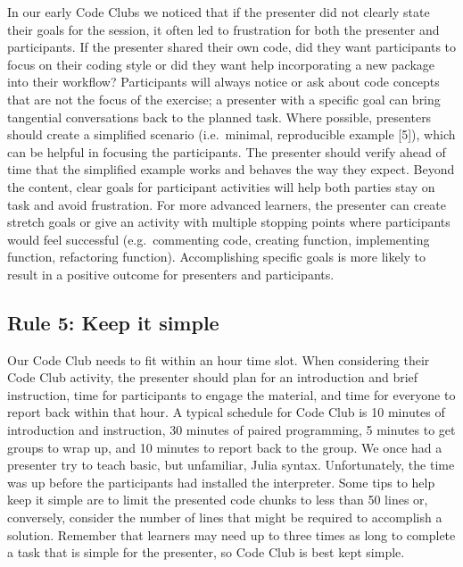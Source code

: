 \documentclass[
  11pt,
]{article}
\begin{document}
In our early Code Clubs we noticed that if the presenter did not clearly
state their goals for the session, it often led to frustration for both
the presenter and participants. If the presenter shared their own code,
did they want participants to focus on their coding style or did they
want help incorporating a new package into their workflow? Participants
will always notice or ask about code concepts that are not the focus of
the exercise; a presenter with a specific goal can bring tangential
conversations back to the planned task. Where possible, presenters
should create a simplified scenario (i.e.~minimal, reproducible example
{[}5{]}), which can be helpful in focusing the participants. The
presenter should verify ahead of time that the simplified example works
and behaves the way they expect. Beyond the content, clear goals for
participant activities will help both parties stay on task and avoid
frustration. For more advanced learners, the presenter can create
stretch goals or give an activity with multiple stopping points where
participants would feel successful (e.g.~commenting code, creating
function, implementing function, refactoring function). Accomplishing
specific goals is more likely to result in a positive outcome for
presenters and participants.

\hypertarget{rule-5-keep-it-simple}{%
\subsection{Rule 5: Keep it simple}\label{rule-5-keep-it-simple}}

Our Code Club needs to fit within an hour time slot. When considering
their Code Club activity, the presenter should plan for an introduction
and brief instruction, time for participants to engage the material, and
time for everyone to report back within that hour. A typical schedule
for Code Club is 10 minutes of introduction and instruction, 30 minutes
of paired programming, 5 minutes to get groups to wrap up, and 10
minutes to report back to the group. We once had a presenter try to
teach basic, but unfamiliar, Julia syntax. Unfortunately, the time was
up before the participants had installed the interpreter. Some tips to
help keep it simple are to limit the presented code chunks to less than
50 lines or, conversely, consider the number of lines that might be
required to accomplish a solution. Remember that learners may need up to
three times as long to complete a task that is simple for the presenter,
so Code Club is best kept simple.
\end{document}
